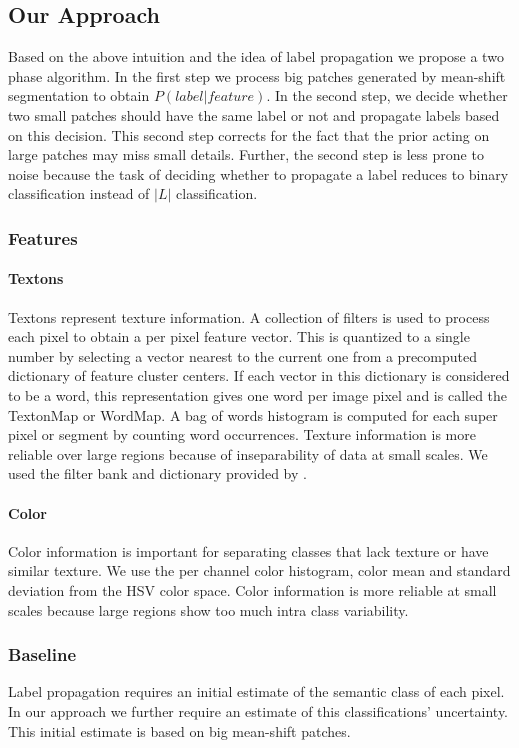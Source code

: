 \documentclass{article} %
\begin{document}
\subsection{Our Approach}
Based on the above intuition and the idea of label propagation we propose a two phase algorithm. In the first step we process big patches generated by mean-shift segmentation to obtain $P(label | feature)$. In the second step, we decide whether two small patches should have the same label or not and propagate labels based on this decision. This second step corrects for the fact that the prior acting on large patches may miss small details. Further, the second step is less prone to noise because the task of deciding whether to propagate a label reduces to binary classification instead of $|L|$ classification.
\subsubsection{Features}
\paragraph{Textons}
Textons represent texture information.
A collection of filters is used to process each pixel to obtain a per
pixel feature vector.
This is quantized to a single number by selecting a vector nearest to the
current one from a precomputed dictionary of feature cluster centers.
If each vector in this dictionary is considered to be a word, this
representation gives one word per image pixel and is called the TextonMap
or WordMap. %
A bag of words histogram is computed for each super pixel or segment by
counting word occurrences.
Texture information is more reliable over large regions because of inseparability of data at small scales.
We used the filter bank and dictionary provided by \cite{malisiewicz-cvpr08}.

\paragraph{Color}
Color information is important for separating classes that lack texture or
have similar texture.
We use the per channel color histogram, color mean and standard deviation
from the HSV color space.
Color information is more reliable at small scales because large regions show too much intra class variability.

\subsubsection{Baseline}
\label{baseline}
Label propagation requires an initial estimate of the semantic class of each pixel. In our approach we further require an estimate of this classifications' uncertainty. This initial estimate is based on big mean-shift patches.
\end{document}
